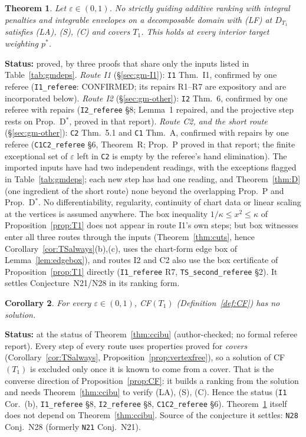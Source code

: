 \documentclass[11pt]{article}
\newtheorem{theorem}{Theorem}[section]
\newtheorem{corollary}[theorem]{Corollary}
\theoremstyle{definition}
\theoremstyle{remark}
\newcommand{\src}[1]{\texttt{#1}}
\newcommand{\status}[1]{\par\smallskip\noindent\textbf{Status:} #1\par\smallskip}
\begin{document}
\begin{theorem}\label{thm:gm}
Let $\varepsilon\in(0,1)$. No strictly guiding additive ranking with integral penalties and integrable envelopes on a decomposable domain with (LF) at $D_{T_1}$ satisfies (LA), (S), (C) and covers $T_1$. This holds at every interior target weighting $p^*$.
\end{theorem}
\status{proved, by three proofs that share only the inputs listed in Table~\ref{tab:gmdeps}.
\emph{Route I1} (\S\ref{sec:gm-I1}): \src{I1} Thm.~I1, confirmed by one referee (\src{I1\_referee}: CONFIRMED; its repairs R1--R7 are expository and are incorporated below).
\emph{Route I2} (\S\ref{sec:gm-other}): \src{I2} Thm.~6, confirmed by one referee with repairs (\src{I2\_referee} \S8; Lemma~1 repaired, and the projective step rests on Prop.~D$^*$, proved in that report).
\emph{Route C2, and the short route} (\S\ref{sec:gm-other}): \src{C2} Thm.~5.1 and \src{C1} Thm.~A, confirmed with repairs by one referee (\src{C1C2\_referee} \S6, Theorem~R; Prop.~P proved in that report; the finite exceptional set of $\varepsilon$ left in \src{C2} is empty by the referee's hand elimination).
The imported inputs have had two independent readings, with the exceptions flagged in Table~\ref{tab:gmdeps}; each new step has had one reading, and Theorem~\ref{thm:D} (one ingredient of the short route) none beyond the overlapping Prop.~P and Prop.~D$^*$. No differentiability, regularity, continuity of chart data or linear scaling at the vertices is assumed anywhere. The box inequality $1/\kappa\le x^2\le\kappa$ of Proposition~\ref{prop:T1} does not appear in route I1's own steps; but box witnesses enter all three routes through the inputs (Theorem~\ref{thm:cuts}, hence Corollary~\ref{cor:TSalways}(b),(c), uses the chart-form edge box of Lemma~\ref{lem:edgebox}), and routes I2 and C2 also use the box certificate of Proposition~\ref{prop:T1} directly (\src{I1\_referee} R7, \src{TS\_second\_referee} \S2). It settles Conjecture~N21/N28 in its ranking form.}

\begin{corollary}\label{cor:CFnone}
For every $\varepsilon\in(0,1)$, CF$(T_1)$ (Definition~\ref{def:CF}) has no solution.
\end{corollary}
\status{at the status of Theorem~\ref{thm:ccibu} (author-checked; no formal referee report). Every step of every route uses properties proved for \emph{covers} (Corollary~\ref{cor:TSalways}, Proposition~\ref{prop:vertexfree}), so a solution of CF$(T_1)$ is excluded only once it is known to come from a cover. That is the converse direction of Proposition~\ref{prop:CF}: it builds a ranking from the solution and needs Theorem~\ref{thm:ccibu} to verify (LA), (S), (C). Hence the status (\src{I1} Cor.~(b), \src{I1\_referee} \S8, \src{I2\_referee} \S8, \src{C1C2\_referee} \S6). Theorem~\ref{thm:gm} itself does not depend on Theorem~\ref{thm:ccibu}. Source of the conjecture it settles: \src{N28} Conj.~N28 (formerly \src{N21} Conj.~N21).}
\end{document}
